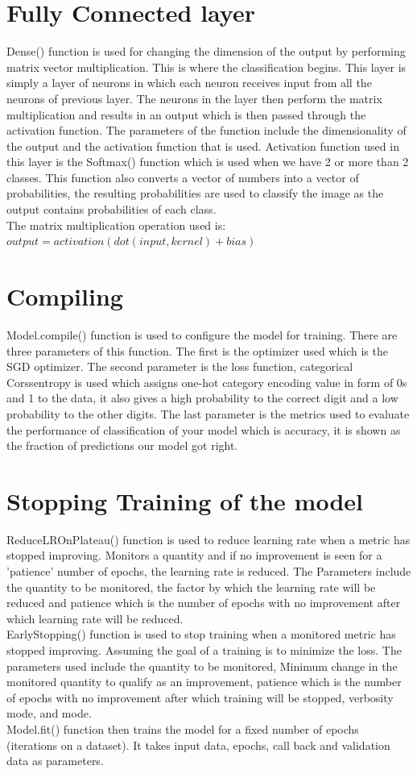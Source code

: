 \section{Fully Connected layer}
Dense() function is used for changing the dimension of the output by performing matrix vector multiplication. This is where the classification begins. This layer is simply a layer of neurons in which each neuron receives input from all the neurons of previous layer. The neurons in the layer then perform the matrix multiplication and results in an output which is then passed through the activation function. The parameters of the function include the dimensionality of the output and the activation function that is used. Activation function used in this layer is the Softmax() function which is used when we have 2 or more than 2 classes. This function also converts a vector of numbers into a vector of probabilities, the resulting probabilities are used to classify the image as the output contains probabilities of each class.\\
The matrix multiplication operation used is: $output = activation(dot(input, kernel) + bias)$

\section{Compiling}
Model.compile() function is used to configure the model for training. There are three parameters of this function. The first is the optimizer used which is the SGD optimizer. The second parameter is the loss function, categorical Corssentropy is used which assigns one-hot category encoding value in form of 0s and 1 to the data, it also gives a high probability to the correct digit and a low probability to the other digits. The last parameter is the metrics used to evaluate the performance of classification of your model which is accuracy, it is shown as the fraction of predictions our model got right. 

\section{Stopping Training of the model}
ReduceLROnPlateau() function is used to reduce learning rate when a metric has stopped improving. Monitors a quantity and if no improvement is seen for a 'patience' number of epochs, the learning rate is reduced. The Parameters include the quantity to be monitored, the factor by which the learning rate will be reduced and patience which is the number of epochs with no improvement after which learning rate will be reduced.\\
EarlyStopping() function is used to stop training when a monitored metric has stopped improving. Assuming the goal of a training is to minimize the loss. The parameters used include the quantity to be monitored, Minimum change in the monitored quantity to qualify as an improvement, patience which is the number of epochs with no improvement after which training will be stopped, verbosity mode, and mode.\\
Model.fit() function then trains the model for a fixed number of epochs (iterations on a dataset). It takes input data, epochs, call back and validation data as parameters.

